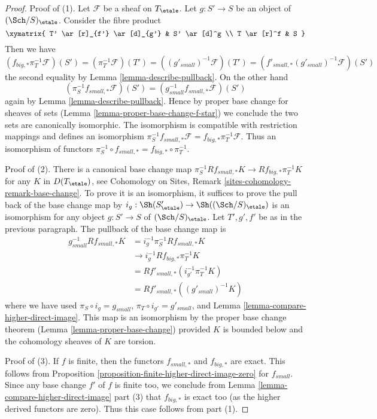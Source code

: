 \begin{proof}
Proof of (1). Let $\mathcal{F}$ be a sheaf on $T_\etale$.
Let $g : S' \to S$ be an object of $(\Sch/S)_\etale$. Consider the
fibre product
$$
\xymatrix{
T' \ar[r]_{f'} \ar[d]_{g'} & S' \ar[d]^g \\
T \ar[r]^f & S
}
$$
Then we have
$$
(f_{big, *}\pi_T^{-1}\mathcal{F})(S') =
(\pi_T^{-1}\mathcal{F})(T') =
((g'_{small})^{-1}\mathcal{F})(T')  =
(f'_{small, *}(g'_{small})^{-1}\mathcal{F})(S')
$$
the second equality by Lemma \ref{lemma-describe-pullback}.
On the other hand
$$
(\pi_S^{-1}f_{small, *}\mathcal{F})(S') =
(g_{small}^{-1}f_{small, *}\mathcal{F})(S')
$$
again by Lemma \ref{lemma-describe-pullback}.
Hence by proper base change for sheaves of sets
(Lemma \ref{lemma-proper-base-change-f-star})
we conclude the two sets are canonically isomorphic.
The isomorphism is compatible with restriction mappings
and defines an isomorphism
$\pi_S^{-1}f_{small, *}\mathcal{F} = f_{big, *}\pi_T^{-1}\mathcal{F}$.
Thus an isomorphism of functors
$\pi_S^{-1} \circ f_{small, *} = f_{big, *} \circ \pi_T^{-1}$.

\medskip\noindent
Proof of (2). There is a canonical base change map
$\pi_S^{-1}Rf_{small, *}K \to Rf_{big, *}\pi_T^{-1}K$
for any $K$ in $D(T_\etale)$, see
Cohomology on Sites, Remark \ref{sites-cohomology-remark-base-change}.
To prove it is an isomorphism, it suffices to prove the pull back of
the base change map by $i_g : \Sh(S'_\etale) \to \Sh((\Sch/S)_\etale)$
is an isomorphism for any object $g : S' \to S$ of $(\Sch/S)_\etale$.
Let $T', g', f'$ be as in the previous paragraph.
The pullback of the base change map is
\begin{align*}
g_{small}^{-1}Rf_{small, *}K
& =
i_g^{-1}\pi_S^{-1}Rf_{small, *}K \\
& \to
i_g^{-1}Rf_{big, *}\pi_T^{-1}K \\
& =
Rf'_{small, *}(i_{g'}^{-1}\pi_T^{-1}K) \\
& =
Rf'_{small, *}((g'_{small})^{-1}K)
\end{align*}
where we have used $\pi_S \circ i_g = g_{small}$,
$\pi_T \circ i_{g'} = g'_{small}$, and
Lemma \ref{lemma-compare-higher-direct-image}.
This map is an isomorphism by the proper base change theorem
(Lemma \ref{lemma-proper-base-change}) provided $K$ is bounded
below and the cohomology sheaves of $K$ are torsion.

\medskip\noindent
Proof of (3). If $f$ is finite, then the functors
$f_{small, *}$ and $f_{big, *}$ are exact. This follows
from Proposition \ref{proposition-finite-higher-direct-image-zero}
for $f_{small}$. Since any base change $f'$ of $f$ is finite too,
we conclude from Lemma \ref{lemma-compare-higher-direct-image} part (3)
that $f_{big, *}$ is exact too (as the higher derived functors are zero).
Thus this case follows from part (1).
\end{proof}





